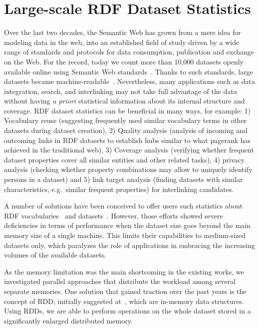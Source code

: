 \chapter{Large-scale RDF Dataset Statistics}
\label{chapter:dist_lod_stats}

Over the last two decades, the Semantic Web has grown from a mere idea for modeling data in the web, into an established field of study driven by a wide range of standards and protocols for data consumption, publication and exchange on the Web.
For the record, today we count more than 10,000 datasets openly available online using Semantic Web standards~.
Thanks to such standards, large datasets became machine-readable~\cite{rw2014}.
Nevertheless, many applications such as data integration, search, and interlinking may not take full advantage of the data without having \textit{a priori} statistical information about its internal structure and coverage. 
\gls{RDF} dataset statistics can be beneficial in many ways, for example: 1) Vocabulary reuse (suggesting frequently used similar vocabulary terms in other datasets during dataset creation), 2) Quality analysis (analysis of incoming and outcoming links in \gls{RDF} datasets to establish hubs similar to what pagerank has achieved in the traditional web), 3) Coverage analysis (verifying whether frequent dataset properties cover all similar entities and other related tasks), 4) privacy analysis (checking whether property combinations may allow to uniquely identify persons in a dataset) and 5) link target analysis (finding datasets with similar characteristics, e.g.~similar frequent properties) for interlinking candidates.

A number of solutions have been conceived to offer users such statistics about \gls{RDF} vocabularies~\cite{vandenbussche2015linked} and datasets~\cite{conf/dexaw/LangeggerW09,ermilov-2013-kesw}.
However, those efforts showed severe deficiencies in terms of performance when the dataset size goes beyond the main memory size of a single machine.
This limits their capabilities to medium-sized datasets only, which paralyzes the role of applications in embracing the increasing volumes of the available datasets.

As the memory limitation was the main shortcoming in the existing works, we investigated parallel approaches that distribute the workload among several separate memories.
One solution that gained traction over the past years is the concept of \gls{RDD}, initially suggested at~\cite{zaharia2012resilient}, which are in-memory data structures. 
Using RDDs, we are able to perform operations on the whole dataset stored in a significantly enlarged distributed memory.

